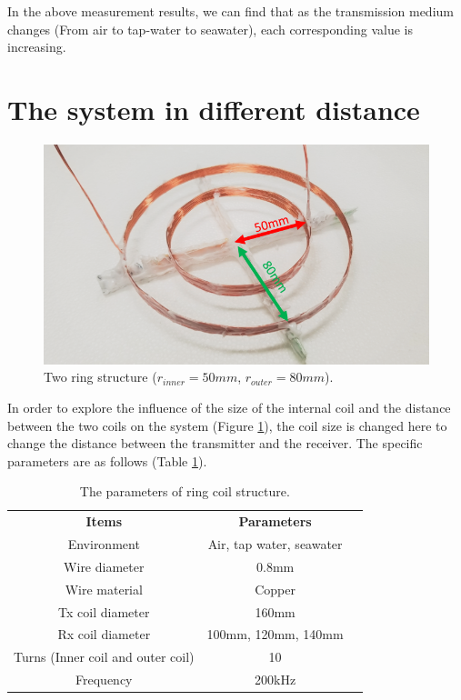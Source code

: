 In the above measurement results, we can find that as the transmission medium changes (From air to tap-water to seawater), each corresponding value is increasing.

\section{The system in different distance}

\begin{figure}[!t]
    \centering
    \includegraphics[width=0.9\linewidth]{images/3_two_ring_coil_5cm_8cm.png}
    \caption{Two ring structure ($r_{inner}=50mm$, $r_{outer}=80mm$).}
    \label{fig:3_two_ring_coil_5cm_8cm}
\end{figure}

In order to explore the influence of the size of the internal coil and the distance between the two coils on the system (Figure \ref{fig:3_two_ring_coil_5cm_8cm}), the coil size is changed here to change the distance between the transmitter and the receiver. The specific parameters are as follows (Table \ref{table:ring coil parameters - different distance}).

\begin{table}[htbp]
    \centering
    \caption{The parameters of ring coil structure.}
    \begin{tabular}{ c|cc }
        \thickhline
        \textbf{Items}                    & \textbf{Parameters}      \\
        \thickhline
        Environment                       & Air, tap water, seawater \\ \hline
        Wire diameter                     & 0.8mm                    \\ \hline
        Wire material                     & Copper                   \\
        \hline
        Tx coil diameter                  & 160mm                    \\ \hline
        Rx coil diameter                  & 100mm, 120mm, 140mm      \\ \hline
        Turns (Inner coil and outer coil) & 10                       \\ \hline
        Frequency                         & 200kHz                   \\ \hline
    \end{tabular}
    \label{table:ring coil parameters - different distance}
\end{table}

